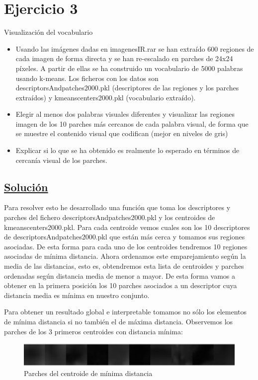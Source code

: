 \documentclass[12pt,a4paper]{article}
\begin{document}
\section{Ejercicio 3}
Visualización del vocabulario
\begin{itemize}
  \item Usando las imágenes dadas en imagenesIR.rar se han extraído 600 regiones de cada imagen de forma directa y se han re-escalado en parches de 24x24 píxeles. A partir de ellas se ha construido un vocabulario de 5000 palabras usando k-means. Los ficheros con los datos son descriptorsAndpatches2000.pkl (descriptores de las regiones y los parches extraídos) y kmeanscenters2000.pkl  (vocabulario extraído).
  \item Elegir al menos dos palabras visuales diferentes y visualizar las regiones imagen de los 10 parches más cercanos de cada palabra visual, de forma que se muestre el contenido visual que codifican (mejor en niveles de gris)
  \item Explicar si lo que se ha obtenido es realmente lo esperado en términos de cercanía visual de los parches.
\end{itemize}

\subsection*{\underline{Solución}}

Para resolver esto he desarrollado una función que toma los descriptores y parches del fichero descriptorsAndpatches2000.pkl y los centroides de kmeanscenters2000.pkl. Para cada centroide vemos cuales son los 10 descriptores de descriptorsAndpatches2000.pkl que están más cerca y tomamos sus regiones asociadas. De esta forma para cada uno de los centroides tendremos 10 regiones asociadas de mínima distancia. Ahora ordenamos este emparejamiento según la media de las distancias, esto es, obtendremos esta lista de centroides y parches ordenadas según distancia media de menor a mayor. De esta forma vamos a obtener en la primera posición los 10 parches asociados a un descriptor cuya distancia media es mínima en nuestro conjunto.

\vspace{10px}

Para obtener un resultado global e interpretable tomamos no sólo los elementos de mínima distancia si no también el de máxima distancia. Observemos los parches de los 3 primeros centroides con distancia mínima:

\begin{figure}[H]
  \centering
  \includegraphics[scale=1.1]{./Imagenes/Ejercicio3-1.png}
  \caption{Parches del centroide de mínima distancia}
	\label{Ejercicio3-1}
\end{figure}
\end{document}
